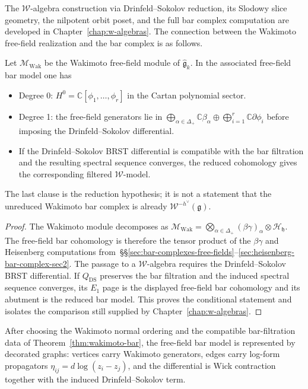The $\mathcal{W}$-algebra construction via Drinfeld--Sokolov reduction,
its Slodowy slice geometry, the nilpotent orbit poset, and the full
bar complex computation are developed in
Chapter~\ref{chap:w-algebras}. The connection between
the Wakimoto free-field realization and the bar complex is as follows.

\begin{theorem}\label{thm:wakimoto-bar}
Let $\mathcal{M}_{\mathrm{Wak}}$ be the Wakimoto free-field module of
$\widehat{\mathfrak{g}}_k$. In the associated free-field bar model one
has
\begin{itemize}
\item Degree 0: $H^0 = \mathbb{C}[\phi_1, \ldots, \phi_r]$ in the
 Cartan polynomial sector.
\item Degree 1: the free-field generators lie in
 $\bigoplus_{\alpha \in \Delta_+} \mathbb{C}\beta_\alpha
 \oplus \bigoplus_{i=1}^r \mathbb{C}\partial\phi_i$ before imposing
 the Drinfeld--Sokolov differential.
\item If the Drinfeld--Sokolov BRST differential is compatible with
 the bar filtration and the resulting spectral sequence converges,
 the reduced cohomology gives the corresponding filtered
 $\mathcal{W}$-model.
\end{itemize}
The last clause is the reduction hypothesis; it is not a statement
that the unreduced Wakimoto bar complex is already
$\mathcal{W}^{-h^\vee}(\mathfrak g)$.
\end{theorem}

\begin{proof}
The Wakimoto module decomposes as
$\mathcal{M}_{\mathrm{Wak}} =
\bigotimes_{\alpha \in \Delta_+}(\beta\gamma)_\alpha\otimes
\mathcal{H}_{\mathfrak h}$. The free-field bar cohomology is therefore
the tensor product of the $\beta\gamma$ and Heisenberg computations
from~\S\S\ref{sec:bar-complexes-free-fields}--\ref{sec:heisenberg-bar-complex-sec2}.
The passage to a $\mathcal W$-algebra requires the
Drinfeld--Sokolov BRST differential. If $Q_{\mathrm{DS}}$ preserves the
bar filtration and the induced spectral sequence converges, its
$E_1$ page is the displayed free-field bar cohomology and its abutment
is the reduced bar model. This proves the conditional statement and
isolates the comparison still supplied by Chapter~\ref{chap:w-algebras}.
\end{proof}

\begin{proposition}\label{prop:wakimoto-graph}
After choosing the Wakimoto normal ordering and the compatible
bar-filtration data of Theorem~\ref{thm:wakimoto-bar}, the free-field
bar model is represented by decorated graphs: vertices carry Wakimoto
generators, edges carry log-form propagators
$\eta_{ij}=d\log(z_i-z_j)$, and the differential is Wick contraction
together with the induced Drinfeld--Sokolov term.
\end{proposition}

